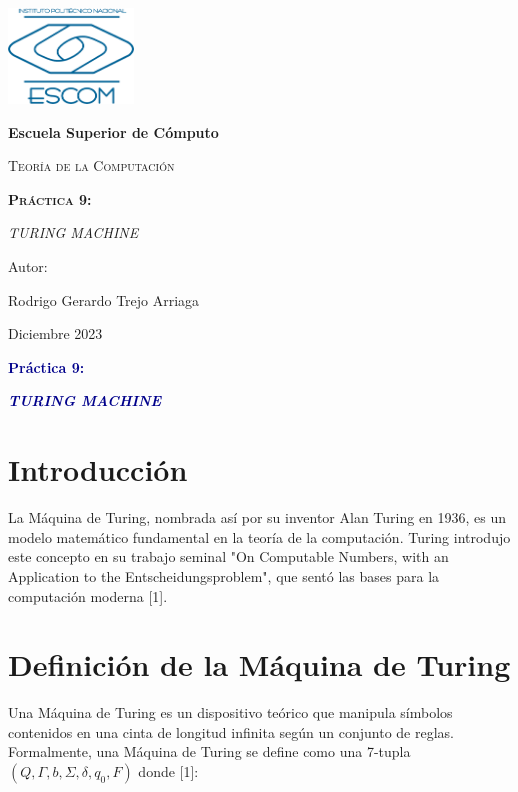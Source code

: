 \documentclass[11pt]{article} %
\begin{document}
	
	\begin{titlepage}
		\centering
		{\includegraphics[width=0.25\textwidth]{descarga}\par}
		\vspace{0.5cm}
		{\bfseries\huge Escuela Superior de Cómputo \par}
		\vspace{0.7cm}
		{\scshape\LARGE Teoría de la Computación \par}
		\vspace{0.3cm}
		\vspace{3.1cm}
		{\scshape \Huge \textbf{Práctica 9:}  \par}
		\vspace{0.03cm}
		{{\LARGE \textit{TURING MACHINE}} \par}
		\vspace{3.5cm}
		{\Large Autor: \par}
		{\Large Rodrigo Gerardo Trejo Arriaga \par}
		\vspace{3cm}
		{\Large Diciembre 2023 \par}
	\end{titlepage}
	
	\begin{center}
		\vspace*{0.1cm}
		{\huge \textcolor{darkBlue}{\textbf{Práctica 9:}} \par}
		
		{\Large \textcolor{darkBlue}{\textbf{\textit{TURING MACHINE}}}}
	\end{center}
	
	
	\section{Introducción}
	La Máquina de Turing, nombrada así por su inventor Alan Turing en 1936, es un modelo matemático fundamental en la teoría de la computación. Turing introdujo este concepto en su trabajo seminal "On Computable Numbers, with an Application to the Entscheidungsproblem", que sentó las bases para la computación moderna [1].
	
	\section{Definición de la Máquina de Turing}
	Una Máquina de Turing es un dispositivo teórico que manipula símbolos contenidos en una cinta de longitud infinita según un conjunto de reglas. Formalmente, una Máquina de Turing se define como una 7-tupla \( (Q, \Gamma, b, \Sigma, \delta, q_0, F) \) donde [1]:
	
\end{document}
